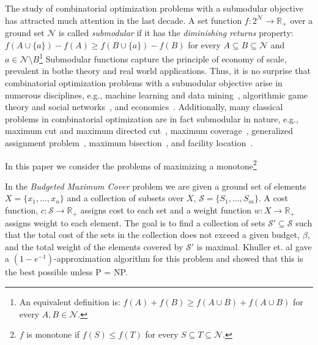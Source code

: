The study of combinatorial optimization problems with a submodular objective has attracted much attention in the last decade. 
A set function $f:2^\mathcal{N} \to \mathbb{R}_+$ over a ground set $\mathcal{N}$ is called \emph{submodular} if it has the \emph{diminishing returns} property:
$f(A \cup \{a\}) - f(A) \geq f(B \cup \{a\}) - f(B)$ for every $A \subseteq B \subseteq \mathcal{N}$ and $a \in \mathcal{N} \setminus B$\footnote{
    An equivalent definition is: $f(A) + f(B) \geq f(A \cup B) + f(A \cup B)$ for every $A,B \in \mathcal{N}$.
}
Submodular functions capture the principle of economy of scale, prevalent in bothe theory and real world applications.
Thus, it is no surprise that combinatorial optimization problems with a submodular objective arise in numerous disciplines, e.g., machine learning and data mining~\cite{bach2013learning,bordeaux2014tractability}, algorithmic game theory and social networks~\cite{dughmi2009revenue,hartline2008optimal,he2015stability,kempe2003maximizing,schulz2013approximating}, and economics~\cite{ahmed2011maximizing}.
Additionally, many classical problems in combinatorial optimization are in fact submodular in nature, e.g., maximum cut and maximum directed cut~\cite{goemans1995improved,Halperin:2001:CAA:365411.365412,Hastad:2001:OIR:502090.502098,Karp1972,Khot05optimalinapproximability}, maximum coverage~\cite{Feige:1998:TLN:285055.285059,KHULLER199939}, generalized assignment problem~\cite{Chekuri06apolynomial,Cohen06anefficient,Feige2006ApproximationAF,Fleischer:2006:TAA:1109557.1109624}, maximum bisection~\cite{DBLP:journals/talg/AustrinBG16,DBLP:journals/algorithmica/FriezeJ97}, and facility location~\cite{DBLP:journals/dam/AgeevS99,CORNUEJOLS1977163,doi:10.1287/mnsc.23.8.789}.

In this paper we consider the problems of maximizing a monotone\footnote{
    $f$ is monotone if $f(S) \leq f(T)$ for every $S \subseteq T \subseteq \mathcal{N}$.
}


In the \emph{Budgeted Maximum Cover} problem we are given a ground set of elements
$X = \{x_1, \dots, x_n\}$ and a collection of subsets over $X$,
$\mathcal{S} = \{S_1, \dots, S_m\}$.
A cost function, $c:\mathcal{S} \to \mathbb{R}_+$ assigns cost to each set
and a weight function $w:X \to \mathbb{R}_+$ assigns weight to each element.
The goal is to find a collection of sets $\mathcal{S'} \subseteq \mathcal{S}$ 
such that the total cost of the sets in the collection does not exceed a given budget, 
$\beta$, and the
total weight of the elements covered by $\mathcal{S'}$ is maximal.
Khuller et. al \cite{khuller1999budgeted}
gave a $(1-e^{-1})$-approximation algorithm for this problem and showed that this
is the best possible unless P = NP.

